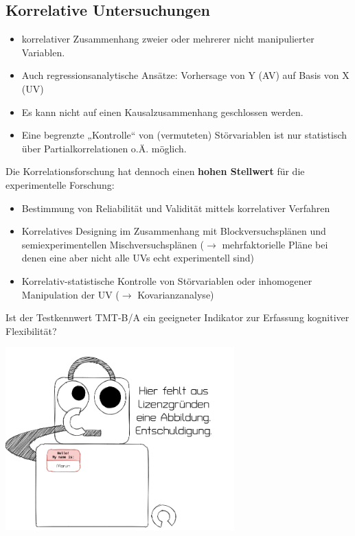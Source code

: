 \documentclass[
]{book}
\providecommand{\tightlist}{%
  \setlength{\itemsep}{0pt}\setlength{\parskip}{0pt}}
\begin{document}
\hypertarget{korrelative-untersuchungen}{%
\subsection{Korrelative Untersuchungen}\label{korrelative-untersuchungen}}

\begin{itemize}
\tightlist
\item
  korrelativer Zusammenhang zweier oder mehrerer nicht manipulierter Variablen.
\item
  Auch regressionsanalytische Ansätze: Vorhersage von Y (AV) auf Basis von X (UV)
\item
  Es kann nicht auf einen Kausalzusammenhang geschlossen werden.
\item
  Eine begrenzte „Kontrolle`` von (vermuteten) Störvariablen ist nur statistisch über Partialkorrelationen o.Ä. möglich.
\end{itemize}

Die Korrelationsforschung hat dennoch einen \textbf{hohen Stellwert} für die experimentelle Forschung:

\begin{itemize}
\tightlist
\item
  Bestimmung von Reliabilität und Validität mittels korrelativer Verfahren
\item
  Korrelatives Designing im Zusammenhang mit Blockversuchsplänen und semiexperimentellen Mischversuchsplänen (\(\rightarrow\) mehrfaktorielle Pläne bei denen eine aber nicht alle UVs echt experimentell sind)
\item
  Korrelativ-statistische Kontrolle von Störvariablen oder inhomogener Manipulation der UV (\(\rightarrow\) Kovarianzanalyse)
\end{itemize}

Ist der Testkennwert TMT-B/A ein geeigneter Indikator zur Erfassung kognitiver Flexibilität?

\begin{center}\includegraphics[width=250pt]{imgs/copyright} \end{center}
\end{document}
